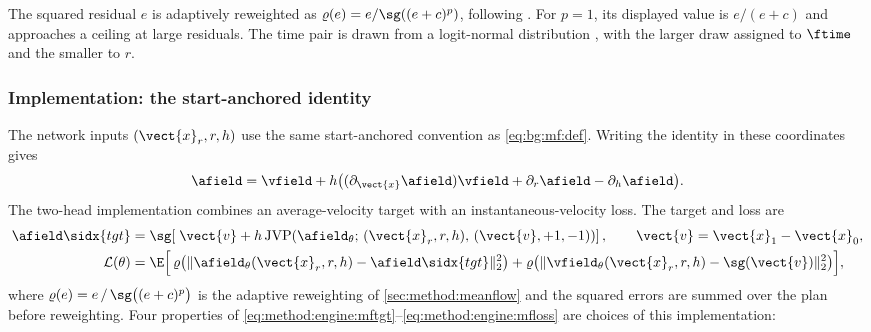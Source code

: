 The squared residual $e$ is adaptively reweighted as
$\varrho(e)=e/\sg((e+c)^{p})$, following \parencite[Sec.~4.3]{geng2025meanflow}.
For $p=1$, its displayed value is $e/(e+c)$ and approaches a ceiling at large residuals.
The time pair is drawn from a logit-normal distribution \parencite{esser2024scaling}, with the
larger draw assigned to $\ftime$ and the smaller to $r$.

\subsubsection*{Implementation: the start-anchored identity}

The network inputs $(\vect{x}_{r},r,h)$ use the same start-anchored convention as
\eqref{eq:bg:mf:def}. Writing the identity in these coordinates gives
\begin{equation}\label{eq:method:engine:mfid}
  \afield=\vfield+h\big((\partial_{\vect{x}}\afield)\vfield
                            +\partial_r\afield-\partial_h\afield\big).
\end{equation}
The two-head implementation combines an average-velocity target with an instantaneous-velocity
loss. The target and loss are
\begin{align}
  \afield\sidx{tgt}
    &= \sg\!\left[\;\vect{v} + h\,
       \mathrm{JVP}\!\left(\afield_{\theta};\,
         (\vect{x}_{r},r,h),\,(\vect{v},+1,-1)\right)\right],
       \qquad \vect{v} = \vect{x}_{1}-\vect{x}_{0},
       \label{eq:method:engine:mftgt}\\
  \mathcal{L}(\theta)
    &= \E\Big[\,
        \varrho\big(\|\afield_{\theta}(\vect{x}_{r},r,h) - \afield\sidx{tgt}\|_{2}^{2}\big)
      + \varrho\big(\|\vfield_{\theta}(\vect{x}_{r},r,h) - \sg(\vect{v})\|_{2}^{2}\big)\Big],
       \label{eq:method:engine:mfloss}
\end{align}
where $\varrho(e) = e\,/\,\sg\big((e+c)^{p}\big)$ is the adaptive reweighting of
\autoref{sec:method:meanflow} and the squared errors are summed over the plan before reweighting.
Four properties of \eqref{eq:method:engine:mftgt}--\eqref{eq:method:engine:mfloss} are choices of
this implementation:

